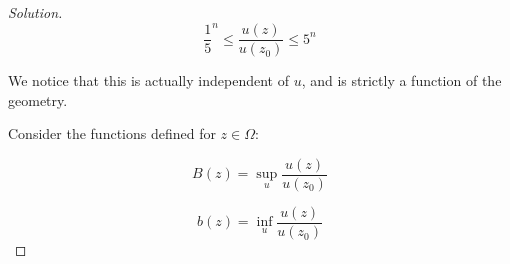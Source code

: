 \documentclass[10pt]{article}
\begin{document}
\begin{proof}[Solution]
$$  \frac{1}{5}^n  \leq  \frac{u(z)}{u(z_0)} \leq  5^n$$

We notice that this is actually independent of $u$, and is strictly a function of the geometry.

Consider the functions defined for $z \in \Omega$:

$$ B(z) = \sup_u \frac{u(z)}{u(z_0)}$$

$$ b(z) = \inf_u \frac{u(z)}{u(z_0)} $$



\end{proof}
\end{document}
